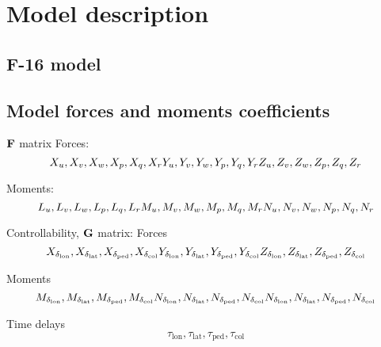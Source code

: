 \section{Model description}

\subsection{F-16 model}

\subsection{Model forces and moments coefficients}
  $\mathrm{\textbf{F}}$ matrix
  Forces: 
  $$
  X_u, X_v, X_w, X_p, X_q, X_r \\
  Y_u, Y_v, Y_w, Y_p, Y_q, Y_r \\
  Z_u, Z_v, Z_w, Z_p, Z_q, Z_r
  $$

  Moments:
  $$
  L_u, L_v, L_w, L_p, L_q, L_r \\
  M_u, M_v, M_w, M_p, M_q, M_r \\
  N_u, N_v, N_w, N_p, N_q, N_r
  $$

  Controllability, $\mathrm{\textbf{G}}$ matrix:
  Forces
  $$
  X_{\delta_{\mathrm{lon}}}, X_{\delta_{\mathrm{lat}}}, X_{\delta_{\mathrm{ped}}}, X_{\delta_{\mathrm{col}}} \\
  Y_{\delta_{\mathrm{lon}}}, Y_{\delta_{\mathrm{lat}}}, Y_{\delta_{\mathrm{ped}}}, Y_{\delta_{\mathrm{col}}} \\
  Z_{\delta_{\mathrm{lon}}}, Z_{\delta_{\mathrm{lat}}}, Z_{\delta_{\mathrm{ped}}}, Z_{\delta_{\mathrm{col}}}
  $$

  Moments
  $$
  M_{\delta_{\mathrm{lon}}}, M_{\delta_{\mathrm{lat}}}, M_{\delta_{\mathrm{ped}}}, M_{\delta_{\mathrm{col}}} \\
  N_{\delta_{\mathrm{lon}}}, N_{\delta_{\mathrm{lat}}}, N_{\delta_{\mathrm{ped}}}, N_{\delta_{\mathrm{col}}} \\
  N_{\delta_{\mathrm{lon}}}, N_{\delta_{\mathrm{lat}}}, N_{\delta_{\mathrm{ped}}}, N_{\delta_{\mathrm{col}}}
  $$

  Time delays
  $$
  \tau_{\mathrm{lon}}, \tau_{\mathrm{lat}}, \tau_{\mathrm{ped}}, \tau_{\mathrm{col}}
  $$